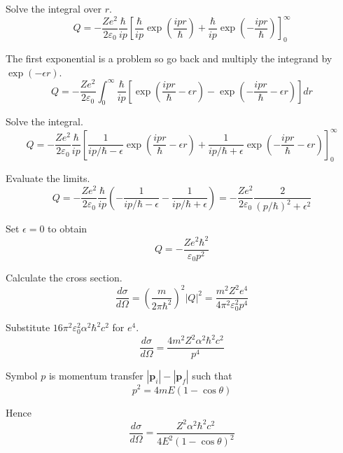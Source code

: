 Solve the integral over $r$.
\begin{equation*}
Q=-\frac{Ze^2}{2\varepsilon_0}\frac{\hbar}{ip}
\left[
\frac{\hbar}{ip}
\exp\left(\frac{ipr}{\hbar}\right)
+\frac{\hbar}{ip}
\exp\left(-\frac{ipr}{\hbar}\right)
\right]_0^\infty
\end{equation*}

The first exponential is a problem
so go back and multiply the integrand by $\exp(-\epsilon r)$.
\begin{equation*}
Q=-\frac{Ze^2}{2\varepsilon_0}
\int_0^\infty
\frac{\hbar}{ip}
\left[\exp\left(\frac{ipr}{\hbar}-\epsilon r\right)
-\exp\left(-\frac{ipr}{\hbar}-\epsilon r\right)\right]
dr
\end{equation*}

Solve the integral.
\begin{equation*}
Q=-\frac{Ze^2}{2\varepsilon_0}
\frac{\hbar}{ip}
\left[
\frac{1}{ip/\hbar-\epsilon}\exp\left(\frac{ipr}{\hbar}-\epsilon r\right)
+\frac{1}{ip/\hbar+\epsilon}\exp\left(-\frac{ipr}{\hbar}-\epsilon r\right)
\right]_0^\infty
\end{equation*}

Evaluate the limits.
\begin{equation*}
Q=-\frac{Ze^2}{2\varepsilon_0}
\frac{\hbar}{ip}
\left(-\frac{1}{ip/\hbar-\epsilon}-\frac{1}{ip/\hbar+\epsilon}\right)
=-\frac{Ze^2}{2\varepsilon_0}\frac{2}{(p/\hbar)^2+\epsilon^2}
\tag{1}
\end{equation*}

Set $\epsilon=0$ to obtain
\begin{equation*}
Q=-\frac{Ze^2\hbar^2}{\varepsilon_0p^2}
\end{equation*}

Calculate the cross section.
\begin{equation*}
\frac{d\sigma}{d\Omega}=\left(\frac{m}{2\pi\hbar^2}\right)^2|Q|^2
=\frac{m^2Z^2e^4}{4\pi^2\varepsilon_0^2p^4}
\tag{2}
\end{equation*}

Substitute $16\pi^2\varepsilon_0^2\alpha^2\hbar^2c^2$ for $e^4$.
\begin{equation*}
\frac{d\sigma}{d\Omega}=\frac{4m^2Z^2\alpha^2\hbar^2c^2}{p^4}
\end{equation*}

Symbol $p$ is momentum transfer $|\mathbf p_i|-|\mathbf p_f|$ such that
\begin{equation*}
p^2=4mE(1-\cos\theta)
\end{equation*}

Hence
\begin{equation*}
\frac{d\sigma}{d\Omega}=\frac{Z^2\alpha^2\hbar^2c^2}{4E^2(1-\cos\theta)^2}
\tag{3}
\end{equation*}

